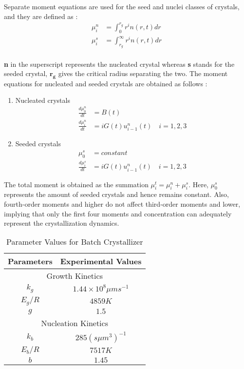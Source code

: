 \documentclass[3p,times]{elsarticle}
\begin{document}
Separate moment equations are used for the seed and nuclei classes of crystals, and they are defined as : \\
\begin{align}
\mu^{n}_{i} &= \int_{0}^{r_{g}} r^{i}n(r,t) dr \\
\mu^{s}_{i} &= \int_{r_{g}}^{\infty} r^{i}n(r,t) dr
\end{align} \\
\textbf{n} in the superscript represents the nucleated crystal whereas \textbf{s} stands for the seeded crystal, $\boldsymbol{r_{g}}$ gives the critical radius separating the two. The moment equations for nucleated and seeded crystals are obtained as follows\cite{yenkie} :

\begin{enumerate}

\item Nucleated crystals\cite{hu,paeng} 
\begin{align}
\frac{d\mu_{0}^{n}}{dt} &= B(t) \\
\frac{d\mu_{i}^{n}}{dt} &= iG(t)u_{i-1}^{n}(t) \quad  i = 1,2,3
\end{align}

\item Seeded crystals\cite{hu,paeng}
\begin{align}
\mu_{0}^{s} &= constant \\ \label{seed}
\frac{d\mu_{i}^{s}}{dt} &= iG(t)u_{i-1}^{n}(t) \quad  i = 1,2,3 
\end{align}
\end{enumerate}
The total moment is obtained as the summation $\mu_{i}^{t} = \mu_{i}^{n} + \mu_{i}^{s}$. Here, $\mu_{0}^{s}$ represents the amount of seeded crystals and hence remains constant. Also, fourth-order moments and higher do not affect third-order moments and lower, implying that only the first four moments and concentration can adequately represent the crystallization dynamics\cite{shi}. 

\begin{center}
\begin{table}[!h]
\centering
\caption{Parameter Values for Batch Crystallizer\cite{hu,paeng}}
\begin{tabular}{|c|c|}
\hline
Parameters & Experimental Values \\
\hline
\multicolumn{2}{|c|}{Growth Kinetics} \\
\hline
$k_{g}$ & $1.44\times10^{8} \mu m s^{-1}$ \\
$E_{g}/R$ & $4859K$ \\
$g$ & $1.5$ \\
\hline
\multicolumn{2}{|c|}{Nucleation Kinetics} \\
\hline
$k_{b}$ & $285 (s \mu m^{3})^{-1}$ \\ 
$E_{b}/R$ & $7517K$ \\
$b$ & $1.45$ \\
\hline
\end{tabular}
\label{Table1}
\end{table}
\end{center}
\end{document}
